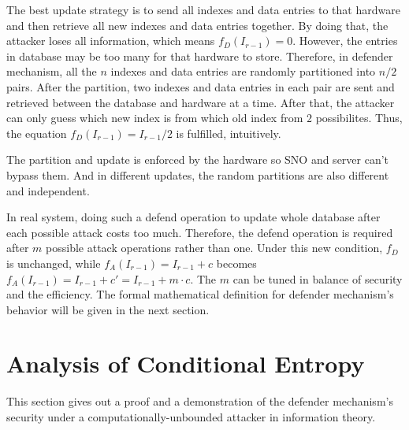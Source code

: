 \documentclass[10pt, conference, compsocconf]{IEEEtran}
\begin{document}
        The best update strategy
        is to send all indexes and data entries to that hardware and then
        retrieve all new indexes and data entries together. By doing that, the attacker
        loses all information, which means $f_D(I_{r-1}) = 0$. However, the entries
        in database may be too many for that hardware to store. Therefore, in defender mechanism,
        all the $n$ indexes and data entries are randomly partitioned into
        $n/2$ pairs.
        After the partition,
        two indexes and data entries in each pair are sent and retrieved
        between the database and hardware at a time. After that, the attacker can
        only guess which new index is from which old index from $2$ possibilites.
        Thus, the equation $f_D(I_{r-1}) = I_{r-1}/2$ is fulfilled, intuitively.

        The partition and update is enforced by the hardware so SNO
        and server can't bypass them. And in
        different updates, the random partitions are also different
        and independent.


        In real system, doing such a defend operation to update whole
        database after each possible attack costs too much.
        Therefore, the defend operation is required after $m$
        possible attack operations rather than one. Under this
        new condition, $f_D$ is unchanged, while $f_A(I_{r-1}) = I_{r-1}+c$
        becomes $f_A(I_{r-1}) = I_{r-1}+c' = I_{r-1}+m \cdot c$.
        The $m$ can be tuned in balance of security and the
        efficiency. The formal mathematical definition for
        defender mechanism's behavior will be given in the
        next section.

\section{Analysis of Conditional Entropy}\label{sec_proof}
    This section gives out a proof
    and a demonstration
    of the defender mechanism's security under a computationally-unbounded attacker
    in information theory.
\end{document}
